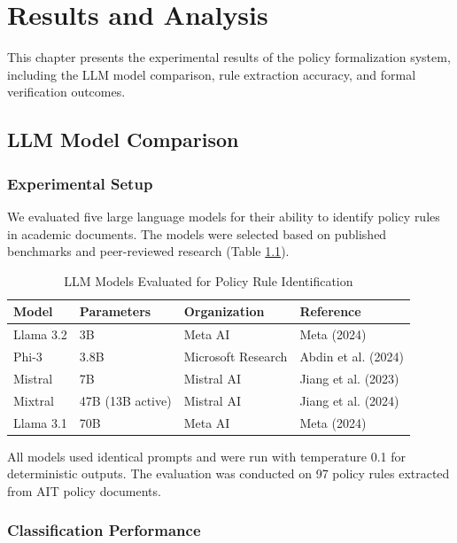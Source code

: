 \chapter{Results and Analysis}
\label{ch:results}

This chapter presents the experimental results of the policy formalization system, including the LLM model comparison, rule extraction accuracy, and formal verification outcomes.

\section{LLM Model Comparison}

\subsection{Experimental Setup}

We evaluated five large language models for their ability to identify policy rules in academic documents. The models were selected based on published benchmarks and peer-reviewed research (Table \ref{tab:models-tested}).

\begin{table}[h]
\centering
\caption{LLM Models Evaluated for Policy Rule Identification}
\label{tab:models-tested}
\begin{tabular}{|l|l|l|l|}
\hline
\textbf{Model} & \textbf{Parameters} & \textbf{Organization} & \textbf{Reference} \\
\hline
Llama 3.2 & 3B & Meta AI & Meta (2024) \\
Phi-3 & 3.8B & Microsoft Research & Abdin et al. (2024) \\
Mistral & 7B & Mistral AI & Jiang et al. (2023) \\
Mixtral & 47B (13B active) & Mistral AI & Jiang et al. (2024) \\
Llama 3.1 & 70B & Meta AI & Meta (2024) \\
\hline
\end{tabular}
\end{table}

All models used identical prompts and were run with temperature 0.1 for deterministic outputs. The evaluation was conducted on 97 policy rules extracted from AIT policy documents.

\subsection{Classification Performance}

